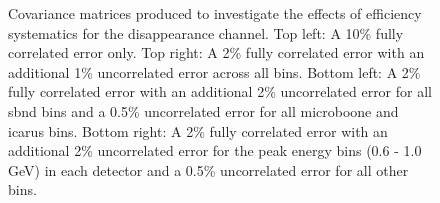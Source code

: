 \begin{figure}[h!]
    \caption[Example efficiency uncertainty covariance matrices.]{Covariance matrices produced to investigate the effects of efficiency systematics for the \numu disappearance channel. Top left: A 10\% fully correlated error only. Top right: A 2\% fully correlated error with an additional 1\% uncorrelated error across all bins. Bottom left: A 2\% fully correlated error with an additional 2\% uncorrelated error for all \gls{sbnd} bins and a 0.5\% uncorrelated error for all \gls{microboone} and \gls{icarus} bins. Bottom right: A 2\% fully correlated error with an additional 2\% uncorrelated error for the peak energy bins (0.6 - 1.0 GeV) in each detector and a 0.5\% uncorrelated error for all other bins.}
    \label{fig:efficiency_cov_matrices}
\end{figure}




